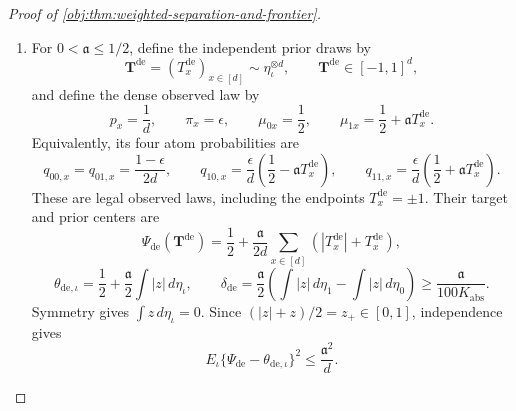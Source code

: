 \begin{proof}[Proof of \cref{obj:thm:weighted-separation-and-frontier}]
\begin{enumerate}
\item
For \(0<\mathfrak a\le1/2\), define the independent prior draws by
\[
\mathbf T^{\mathrm{de}}
=(T_x^{\mathrm{de}})_{x\in[d]}
\sim\eta_\iota^{\otimes d},
\qquad
\mathbf T^{\mathrm{de}}\in[-1,1]^d,
\]
and define the dense observed law by
\[
p_x=\frac1d,
\qquad
\pi_x=\epsilon,
\qquad
\mu_{0x}=\frac12,
\qquad
\mu_{1x}=\frac12+\mathfrak a T_x^{\mathrm{de}}.
\]
Equivalently, its four atom probabilities are
\[
q_{00,x}=q_{01,x}=\frac{1-\epsilon}{2d},
\qquad
q_{10,x}=\frac{\epsilon}{d}\left(\frac12-\mathfrak a T_x^{\mathrm{de}}\right),
\qquad
q_{11,x}=\frac{\epsilon}{d}\left(\frac12+\mathfrak a T_x^{\mathrm{de}}\right).
\]
These are legal observed laws, including the endpoints \(T_x^{\mathrm{de}}=\pm1\).
Their target and prior centers are
\[
\Psi_{\mathrm{de}}(\mathbf T^{\mathrm{de}})
=\frac12+\frac{\mathfrak a}{2d}
 \sum_{x\in[d]}(|T_x^{\mathrm{de}}|+T_x^{\mathrm{de}}),
\]
\[
\theta_{\mathrm{de},\iota}
=\frac12+\frac{\mathfrak a}{2}\int|z|\,d\eta_\iota,
\qquad
\delta_{\mathrm{de}}
=\frac{\mathfrak a}{2}
 \left(\int|z|\,d\eta_1-\int|z|\,d\eta_0\right)
\ge\frac{\mathfrak a}{100K_{\mathrm{abs}}}.
\]
Symmetry gives \(\int z\,d\eta_\iota=0\). Since
\((|z|+z)/2=z_+\in[0,1]\), independence gives
\[
E_\iota\{\Psi_{\mathrm{de}}-\theta_{\mathrm{de},\iota}\}^2
\le\frac{\mathfrak a^2}{d}.
\]


\end{enumerate}
\end{proof}
